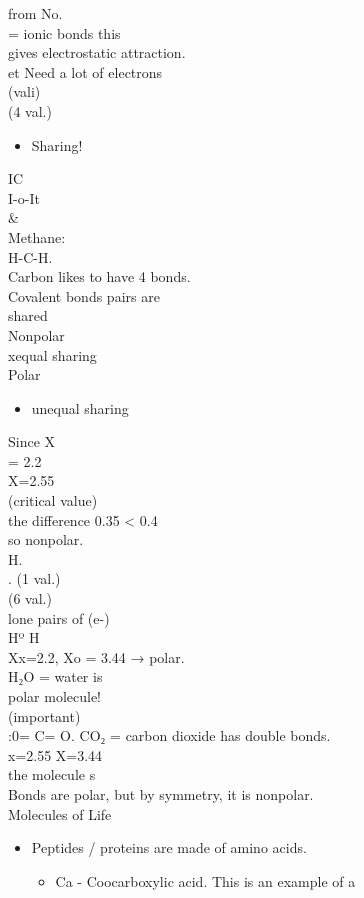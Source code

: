 \documentclass{article}
\begin{document}
from No.\\
= ionic bonds this\\
gives electrostatic attraction.\\
et Need a lot of electrons\\
(vali)\\
(4 val.)
\begin{itemize}
\item  Sharing!
\end{itemize}
IC\\
I-o-It\\
\&\\
Methane:\\
H-C-H.\\
Carbon likes to have 4 bonds.\\
Covalent bonds pairs are\\
shared\\
Nonpolar\\
xequal sharing\\
Polar
\begin{itemize}
\item  unequal sharing
\end{itemize}
Since X\\
= 2.2\\
X=2.55\\
(critical value)\\
the difference 0.35 < 0.4\\
so nonpolar.\\
H.\\
. (1 val.)\\
(6 val.)\\
lone pairs of (e-)\\
Hº H\\
Xx=2.2, Xo = 3.44 → polar.\\
H₂O = water is\\
polar molecule!\\
(important)\\
:0= C= O. CO₂ = carbon dioxide has double bonds.\\
x=2.55 X=3.44\\
the molecule s\\
Bonds are polar, but by symmetry, it is nonpolar.\\
Molecules of Life
\begin{itemize}
\item  Peptides / proteins are made of amino acids.
\begin{itemize}
\item Ca - Coocarboxylic acid. This is an example of a
\end{itemize}
\end{itemize}
\end{document}
